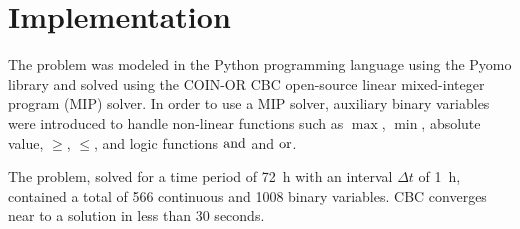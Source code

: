 \section{Implementation}

The problem was modeled in the Python programming language using the Pyomo library\cite{Pyomo} and solved using the COIN-OR CBC\cite{CBC} open-source linear mixed-integer program (MIP) solver. In order to use a MIP solver, auxiliary binary variables were introduced to handle non-linear functions such as $\max$, $\min$, absolute value, $\ge$, $\le$, and logic functions $\operatorname{and}$ and $\operatorname{or}$.

The problem, solved for a time period of \SI{72}{h} with an interval $\Delta t$ of \SI{1}{h}, contained a total of 566 continuous and 1008 binary variables. CBC converges near to a solution in less than 30 seconds.